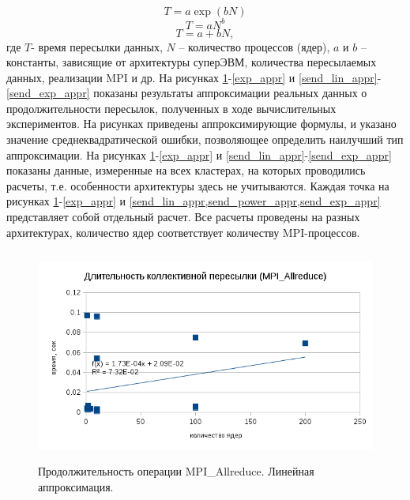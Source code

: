 $$
T = a \exp (b N)
$$
$$
T = a N^b
$$
$$
T = a +bN,
$$
        где $T$- время пересылки данных, $N$ – количество процессов (ядер), $a$ и $b$ – константы, зависящие от архитектуры суперЭВМ, количества пересылаемых данных, реализации MPI и др. На рисунках \ref{lin_appr}-\ref{exp_appr} и \ref{send_lin_appr}-\ref{send_exp_appr} показаны результаты аппроксимации реальных данных о продолжительности пересылок, полученных в ходе вычислительных экспериментов. На рисунках приведены аппроксимирующие формулы, и указано значение среднеквадратической ошибки, позволяющее определить наилучший тип аппроксимации. На рисунках \ref{lin_appr}-\ref{exp_appr} и \ref{send_lin_appr}-\ref{send_exp_appr} показаны данные, измеренные на всех кластерах, на которых проводились расчеты, т.е. особенности архитектуры здесь не учитываются.
        Каждая точка на рисунках \ref{lin_appr}-\ref{exp_appr} и \ref{send_lin_appr,send_power_appr,send_exp_appr} представляет собой отдельный расчет. Все расчеты проведены на разных архитектурах, количество ядер соответствует количеству MPI-процессов.
        
        \begin{figure}[htb]
        	\begin{center}
        		\includegraphics[height=7cm,keepaspectratio]{images/RomanenkoAASnytnikovAVChernykhIGadaptationtosupercomputerfinalEXTENDEDREFERENCES-img2.png}
        	\end{center}
        	\caption{Продолжительность операции MPI\_Allreduce. Линейная аппроксимация.}
        	\label{lin_appr}
        \end{figure}
        
        
